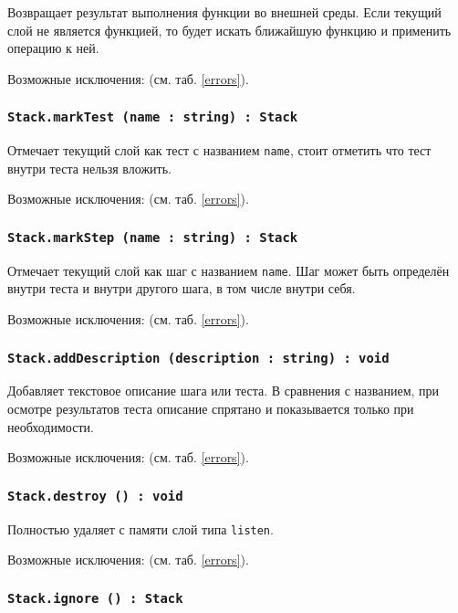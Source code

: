 Возвращает результат выполнения функции во внешней среды. Если текущий слой не является функцией, то будет искать ближайшую функцию и применить операцию к ней.

Возможные исключения:  (см. таб. \ref{errors}).

\subsubsection{\texttt{Stack.markTest (name : string) : Stack}}

Отмечает текущий слой как тест с названием \texttt{name}, стоит отметить что тест внутри теста нельзя вложить.

Возможные исключения:  (см. таб. \ref{errors}).

\subsubsection{\texttt{Stack.markStep (name : string) : Stack}}

Отмечает текущий слой как шаг с названием \texttt{name}. Шаг может быть определён внутри теста и внутри другого шага, в том числе внутри себя.

Возможные исключения:  (см. таб. \ref{errors}).

\subsubsection{\texttt{Stack.addDescription (description : string) : void}}

Добавляет текстовое описание шага или теста. В сравнения с названием, при осмотре результатов теста описание спрятано и показывается только при необходимости.

Возможные исключения:  (см. таб. \ref{errors}).

\subsubsection{\texttt{Stack.destroy () : void}}

Полностью удаляет с памяти слой типа \texttt{listen}.

Возможные исключения:  (см. таб. \ref{errors}).

\subsubsection{\texttt{Stack.ignore () : Stack}}

